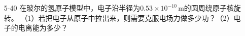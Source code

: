 \documentclass[UTF-8]{ctexart}
\begin{document}
\begin{enumerate}
    \item[5-40] 在玻尔的氢原子模型中，电子沿半径为\(0.53\times10^{-10}\,\mathrm{m}\)的圆周绕原子核旋转。
        （1）若把电子从原子中拉出来，则需要克服电场力做多少功？（2）电子的电离能为多少？
    

\end{enumerate}
\end{document}
